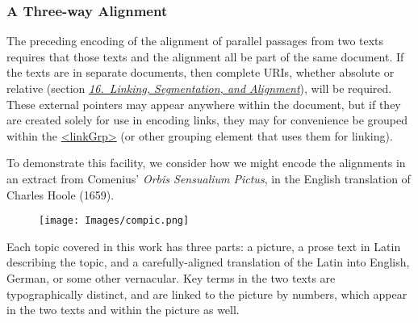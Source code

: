 \subsubsection[{A Three-way Alignment}]{A Three-way Alignment}\label{SACSXA}\par
The preceding encoding of the alignment of parallel passages from two texts requires that those texts and the alignment all be part of the same document. If the texts are in separate documents, then complete URIs, whether absolute or relative (section \textit{\hyperref[SA]{16.\ Linking, Segmentation, and Alignment}}), will be required. These external pointers may appear anywhere within the document, but if they are created solely for use in encoding links, they may for convenience be grouped within the \hyperref[TEI.linkGrp]{<linkGrp>} (or other grouping element that uses them for linking).\par
To demonstrate this facility, we consider how we might encode the alignments in an extract from Comenius' \textit{Orbis Sensualium Pictus}, in the English translation of Charles Hoole (1659).  \begin{figure}[htbp]
\noindent\noindent\texttt{[image: Images/compic.png]}\end{figure}
 Each topic covered in this work has three parts: a picture, a prose text in Latin describing the topic, and a carefully-aligned translation of the Latin into English, German, or some other vernacular. Key terms in the two texts are typographically distinct, and are linked to the picture by numbers, which appear in the two texts and within the picture as well.\par
